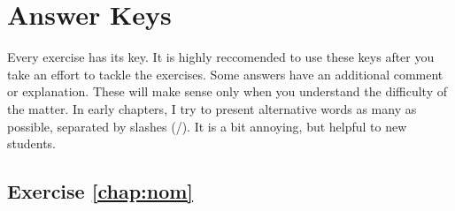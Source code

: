 \chapter{Answer Keys}\label{chap:keys}

Every exercise has its key. It is highly reccomended to use these keys after you take an effort to tackle the exercises. Some answers have an additional comment or explanation. These will make sense only when you understand the difficulty of the matter. In early chapters, I try to present alternative words as many as possible, separated by slashes (/). It is a bit annoying, but helpful to new students.

\section*{Exercise \ref{chap:nom}}
